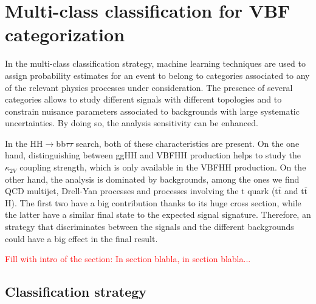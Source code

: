 \documentclass[../main.tex]{subfiles}
\begin{document}
\section{Multi-class classification  for VBF categorization}
\label{hh:sec:multiclass}

In the multi-class classification strategy, machine learning techniques are used to assign probability estimates for an event to belong to categories associated to any of the relevant physics processes under consideration.
The presence of several categories allows to study different signals with different topologies and to constrain nuisance parameters associated to backgrounds with large systematic uncertainties. By doing so, the analysis sensitivity can be enhanced.

In the HH$\to$bb$\tau\tau$ search, both of these characteristics are present. On the one hand, distinguishing between ggHH and VBFHH production helps to study the $\kappa_{2V}$ coupling strength, which is only available in the VBFHH production. On the other hand, the analysis is dominated by backgrounds, among the ones we find QCD multijet, Drell-Yan processes and processes involving the t quark (t$\bar{\text{t}}$ and t$\bar{\text{t}}$H). The first two have a big contribution thanks to its huge cross section, while the latter have a similar final state to the expected signal signature. Therefore, an strategy that discriminates between the signals and the different backgrounds could have a big effect in the final result.

\textcolor{red}{Fill with intro of the section: In section blabla, in section blabla...}

\subsection{Classification strategy}
\label{subs:hh:multi_class_strat}
\end{document}
